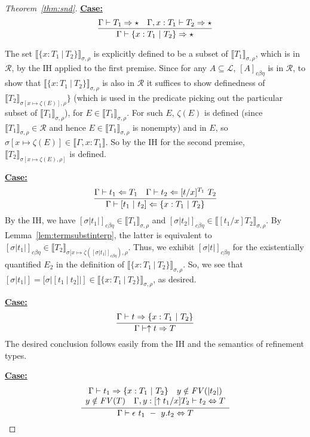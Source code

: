 \documentclass{article}
\newcommand{\choice}[0]{\zeta}
\newcommand{\interp}[1]{\llbracket #1 \rrbracket}
\newcommand{\tpcheck}[0]{\Leftarrow}
\newcommand{\tpsynth}[0]{\Rightarrow}
\newcommand{\cbe}[0]{c\beta\eta}
\newcommand{\startcase}[1]{\vspace{#1} \noindent\textbf{\underline{Case:}}}
\begin{document}
\begin{proof}[Theorem~\ref{thm:snd}]
  \startcase{.2cm}
  \[
    \infer{
      \Gamma \vdash \{ x : T_1\ |\ T_2\} \tpsynth \star
    }{
      \Gamma \vdash T_1 \tpsynth \star
      \quad \Gamma, x : T_1 \vdash T_2 \tpsynth \star
    }
  \]

  The set $\interp{\{x : T_1\ |\ T_2\}}_{\sigma,\rho}$ is explicitly defined to
be a subset of $\interp{T_1}_{\sigma,\rho}$, which is in $\mathcal{R}$,
by the IH applied to the first premise.  Since for any
$A\subseteq\mathcal{L}$, $[A]_{\cbe}$ is in $\mathcal{R}$, to show that
$\interp{\{x : T_1\ |\ T_2\}}_{\sigma,\rho}$ is also in $\mathcal{R}$ it suffices
to show definedness of $\interp{T_2}_{\sigma[x\mapsto \choice(E)],\rho}\}$
(which is used in the predicate picking out the
particular subset of $\interp{T_1}_{\sigma,\rho}$), for
$E\in\interp{T_1}_{\sigma,\rho}$.  For such $E$, $\choice(E)$ is defined
(since $\interp{T_1}_{\sigma,\rho}\in\mathcal{R}$ and hence $E\in\interp{T_1}_{\sigma,\rho}$ is nonempty)
and in $E$,
so $\sigma[x\mapsto\choice(E)]\in\interp{\Gamma,x:T_1}$.
So by the IH for the second premise,
$\interp{T_2}_{\sigma[x\mapsto\choice(E),\rho]}$ is defined.

\startcase{.2cm}
\[
  \infer{\Gamma\vdash [ t_1\ |\ t_2 ] \tpcheck \{ x : T_1\ |\ T_2\}}
  {
    \Gamma \vdash t_1 \tpcheck T_1
    \quad \Gamma \vdash t_2 \tpcheck [t/x]^{T_1}\ T_2
  }
\]
By the IH, we have $[\sigma |t_1|]_{\cbe}\in\interp{T_1}_{\sigma,\rho}$ and
$[\sigma |t_2|]_{\cbe}\in\interp{[t_1/x]T_2}_{\sigma,\rho}$.
By Lemma~\ref{lem:termsubstinterp}, the latter is equivalent to
$[\sigma |t_1|]_{\cbe}\in\interp{T_2}_{\sigma[x\mapsto\choice([\sigma
  |t_1|]_{\cbe}),\rho}$.
Thus, we exhibit \([\sigma |t|]_{\cbe}\) for the existentially quantified
\(E_2\) in the definition of \(\interp{\{x : T_1\ |\ T_2\}}_{\sigma,\rho}\).
So, we see that \([\sigma|t_1|] = [\sigma|[ t_1\ |\ t_2]|] \in \interp{\{x :
  T_1\ |\ T_2\}}_{\sigma,\rho}\), as desired.

\startcase{.2cm}
\[
  \infer{\Gamma\vdash \uparrow t \tpsynth T}{\Gamma\vdash t \tpsynth \{ x : T_1\
    |\ T_2\}}
\]
The desired conclusion follows easily from the IH and the semantics of
refinement types.

\startcase{.2cm}
\[
  \infer{
    \Gamma \vdash \epsilon\ t_1\ -\ y.t_2 \Leftrightarrow T
  }{
    \begin{array}{c}
      \Gamma \vdash t_1 \tpsynth \{ x : T_1\ |\ T_2\}
      \quad y \notin \mathit{FV}(|t_2|)
      \\
      y \notin \mathit{FV}(T)
      \quad \Gamma, y : [\uparrow t_1/x]T_2 \vdash t_2 \Leftrightarrow T
    \end{array}
  }
\]


\end{proof}
\end{document}
